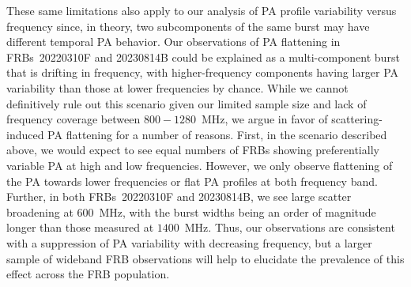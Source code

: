 \documentclass[twocolumn, linenumbers]{aastex701}
\begin{document}
These same limitations also apply to our analysis of PA profile variability versus frequency since, in theory, two subcomponents of the same burst may have different temporal PA behavior. Our observations of PA flattening in FRBs~20220310F and 20230814B could be explained as a multi-component burst that is drifting in frequency, with higher-frequency components having larger PA variability than those at lower frequencies by chance. While we cannot definitively rule out this scenario given our limited sample size and lack of frequency coverage between $800-1280$~MHz, we argue in favor of scattering-induced PA flattening for a number of reasons. First, in the scenario described above, we would expect to see equal numbers of FRBs showing preferentially variable PA at high and low frequencies. However, we only observe flattening of the PA towards lower frequencies or flat PA profiles at both frequency band. Further, in both FRBs~20220310F and 20230814B, we see large scatter broadening at $600$~MHz, with the burst widths being an order of magnitude longer than those measured at $1400$~MHz. Thus, our observations are consistent with a suppression of PA variability with decreasing frequency, but a larger sample of wideband FRB observations will help to elucidate the prevalence of this effect across the FRB population.
\end{document}
